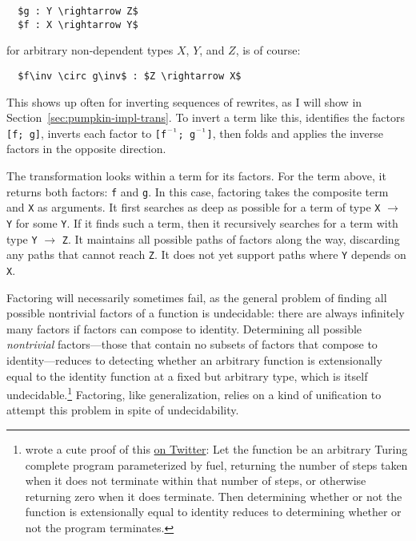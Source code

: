 \begin{lstlisting}
  $g : Y \rightarrow Z$
  $f : X \rightarrow Y$
\end{lstlisting}
for arbitrary non-dependent types $X$, $Y$, and $Z$,
is of course:

\begin{lstlisting}
  $f\inv \circ g\inv$ : $Z \rightarrow X$ 
\end{lstlisting}
This shows up often for inverting sequences of rewrites, as I will show in Section~\ref{sec:pumpkin-impl-trans}.
To invert a term like this, \sysname identifies the factors \lstinline{[f; g]}, 
inverts each factor to \lstinline{[f}$\inv$\lstinline{; g}$\inv$\lstinline{]}, 
then folds and applies the inverse factors in the opposite direction.

The  transformation looks within a term for its factors.
For the term above, it returns both factors: \lstinline{f} and \lstinline{g}.
In this case, factoring takes the composite term and \lstinline{X} as arguments.
It first searches as deep as possible for a term of type \lstinline{X} $\rightarrow$ \lstinline{Y} for some \lstinline{Y}.
If it finds such a term, then it recursively searches for a term with type \lstinline{Y} $\rightarrow$ \lstinline{Z}. 
It maintains all possible 
paths of factors along the way, discarding any paths that cannot reach \lstinline{Z}.
It does not yet support paths where \lstinline{Y} depends on \lstinline{X}.

Factoring will necessarily sometimes fail, as the general problem of finding all possible nontrivial factors of a function is undecidable:
there are always infinitely many factors if factors can compose to identity.
Determining all possible \textit{nontrivial} factors---those that contain no subsets of factors
that compose to identity---reduces to detecting whether an arbitrary function is extensionally equal
to the identity function at a fixed but arbitrary type,
which is itself undecidable.\footnote{ wrote a cute proof of this \href{https://twitter.com/ezyang/status/1391546552989241346}{on Twitter}: Let the function be an arbitrary Turing complete program parameterized by fuel, returning
the number of steps taken when it does not terminate within that number of steps, or otherwise returning zero when it does terminate.
Then determining whether or not the function is extensionally equal to identity reduces to determining whether or not
the program terminates.}
Factoring, like generalization, relies on a kind of unification to attempt this problem in spite of undecidability.

